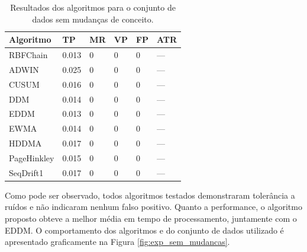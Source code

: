 \documentclass[msc, classic, a4paper]{ufbathesis}
\begin{document}
\begin{table}[h]
\centering
\caption{Resultados dos algoritmos para o conjunto de dados sem mudanças de conceito.}
\label{tbl:exp1}
\begin{tabular}{llllll}

\toprule
Algoritmo              & TP                     & MR                     & VP                     & FP                     & ATR                    \\ 
\midrule
RBFChain               & 0.013                  & 0                      & 0                      & 0                      & ---                    \\ 
ADWIN                  & 0.025                  & 0                      & 0                      & 0                      & ---                    \\ 
CUSUM                  & 0.016                  & 0                      & 0                      & 0                      & ---                    \\ 
DDM                    & 0.014                  & 0                      & 0                      & 0                      & ---                    \\ 
EDDM                   & 0.013                  & 0                      & 0                      & 0                      & ---                    \\ 
EWMA                   & 0.014                  & 0                      & 0                      & 0                      & ---                    \\ 
HDDMA                  & 0.017                  & 0                      & 0                      & 0                      & ---                    \\ 
PageHinkley            & 0.015                  & 0                      & 0                      & 0                      & ---                    \\ 
SeqDrift1              & 0.017                  & 0                      & 0                      & 0                      & ---                    \\ 
\bottomrule


\end{tabular}
\end{table}


Como pode ser observado, todos algoritmos testados demonstraram tolerância a ruídos e não indicaram nenhum falso positivo.
Quanto a performance, o algoritmo proposto obteve a melhor média em tempo de processamento, juntamente com o EDDM.
O comportamento dos algoritmos e do conjunto de dados utilizado é apresentado graficamente na Figura \ref{fig:exp_sem_mudancas}.
\end{document}
